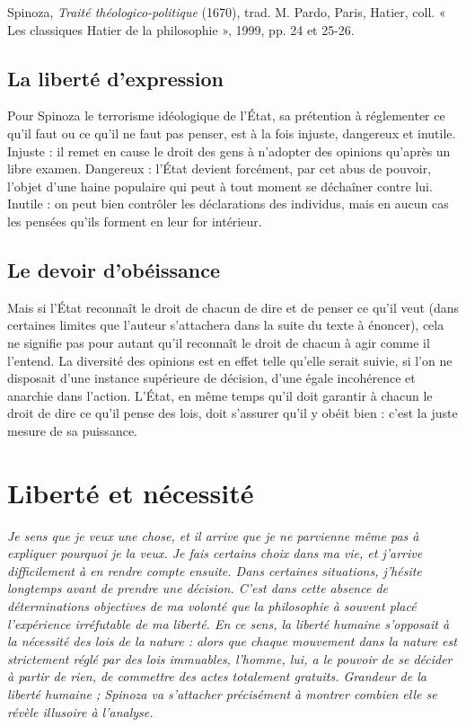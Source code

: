 \vspace{0.25cm}
Spinoza, {\it Traité théologico-politique} (1670), trad. M. Pardo,
Paris, Hatier, coll. « Les classiques Hatier de la philosophie », 1999, pp. 24 et 25-26.

\subsection{La liberté d'expression}

Pour Spinoza le terrorisme idéologique de l'État, sa prétention à réglementer ce
qu'il faut ou ce qu'il ne faut pas penser, est à la fois injuste, dangereux et inutile.
Injuste : il remet en cause le droit des gens à n’adopter des opinions qu'après un
libre examen. Dangereux : l'État devient forcément, par cet abus de pouvoir,
l’objet d’une haine populaire qui peut à tout moment se déchaîner contre lui.
Inutile : on peut bien contrôler les déclarations des individus, mais en aucun cas
les pensées qu'ils forment en leur for intérieur.

\subsection{Le devoir d’obéissance}

Mais si l’État reconnaît le droit de chacun de dire et de penser ce qu'il veut (dans
certaines limites que l’auteur s’attachera dans la suite du texte à énoncer), cela ne
signifie pas pour autant qu'il reconnaît le droit de chacun à agir comme il l'entend.
La diversité des opinions est en effet telle qu'elle serait suivie, si l'on ne disposait
d’une instance supérieure de décision, d’une égale incohérence et anarchie dans
l’action. L'État, en même temps qu'il doit garantir à chacun le droit de dire ce qu'il
pense des lois, doit s'assurer qu'il y obéit bien : c’est la juste mesure de sa puissance.

\section{Liberté et nécessité}

{\it Je sens que je veux une chose, et il arrive que je ne parvienne même pas à expliquer
pourquoi je la veux. Je fais certains choix dans ma vie, et j'arrive difficilement à en
rendre compte ensuite. Dans certaines situations, j'hésite longtemps avant de
prendre une décision. C’est dans cette absence de déterminations objectives de ma
volonté que la philosophie à souvent placé l'expérience irréfutable de ma liberté.
En ce sens, la liberté humaine s’opposait à la nécessité des lois de la nature : alors
que chaque mouvement dans la nature est strictement réglé par des lois immuables,
l’homme, lui, a le pouvoir de se décider à partir de rien, de commettre des actes
totalement gratuits. Grandeur de la liberté humaine ; Spinoza va s'attacher
précisément à montrer combien elle se révèle illusoire à l'analyse.}

